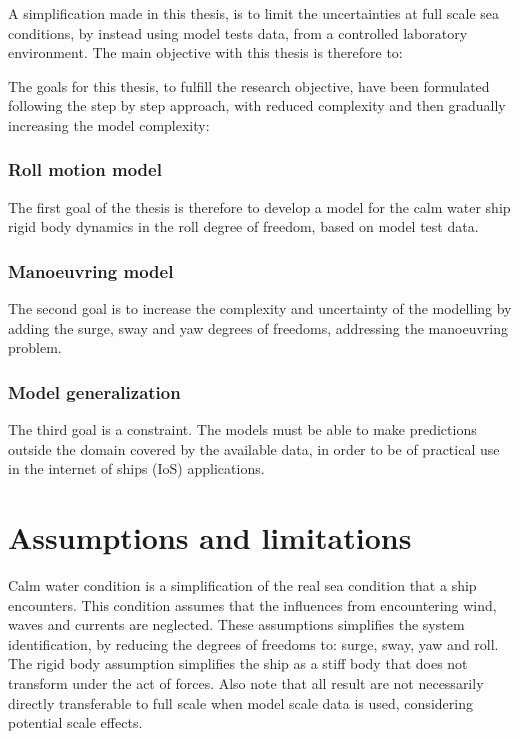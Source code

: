 \noindent A simplification made in this thesis, is to limit the uncertainties at full scale sea conditions, by instead using model tests data, from a controlled laboratory environment. The main objective with this thesis is therefore to:
\begin{quote} 
\expandafter\MakeUppercase \objective
\end{quote}

\noindent 
The goals for this thesis, to fulfill the research objective, have been formulated following the step by step approach, with reduced complexity and then gradually increasing the model complexity:

\subsubsection*{Roll motion model}
The first goal of the thesis is therefore to develop a model for the calm water ship rigid body dynamics in the roll degree of freedom, based on model test data.

\subsubsection*{Manoeuvring model}
The second goal is to increase the complexity and uncertainty of the modelling by adding the surge, sway and yaw degrees of freedoms, addressing the manoeuvring problem.

\subsubsection*{Model generalization}
The third goal is a constraint. The models must be able to make predictions outside the domain covered by the available data, in order to be of practical use in the internet of ships (IoS) applications.

\section{Assumptions and limitations}
Calm water condition is a simplification of the real sea condition that a ship encounters. This condition assumes that the influences from encountering wind, waves and currents are neglected. These assumptions simplifies the system identification, by reducing the degrees of freedoms to: surge, sway, yaw and roll. 
The rigid body assumption simplifies the ship as a stiff body that does not transform under the act of forces. 
Also note that all result are not necessarily directly transferable to full scale when model scale data is used, considering potential scale effects. 

